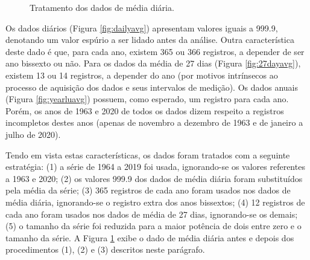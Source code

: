 \begin{figure}[ht!]
	\caption{Tratamento dos dados de média diária.}
	\vspace{0mm}	%
	\begin{center}
	\end{center}
	\vspace{3mm}	%
	\label{fig:datavis}
\end{figure}

Os dados diários (Figura \ref{fig:dailyavg}) apresentam valores iguais a 999.9, denotando um valor espúrio a ser lidado antes da análise. Outra característica deste dado é que, para cada ano, existem 365 ou 366 registros, a depender de ser ano bissexto ou não. Para os dados da média de 27 dias (Figura \ref{fig:27dayavg}), existem 13 ou 14 registros, a depender do ano (por motivos intrínsecos ao processo de aquisição dos dados e seus intervalos de medição). Os dados anuais (Figura \ref{fig:yearluavg}) possuem, como esperado, um registro para cada ano. Porém, os anos de 1963 e 2020 de todos os dados dizem respeito a registros incompletos destes anos (apenas de novembro a dezembro de 1963 e de janeiro a julho de 2020). 

Tendo em vista estas características, os dados foram tratados com a seguinte estratégia: (1) a série de 1964 a 2019 foi usada, ignorando-se os valores referentes a 1963 e 2020; (2) os valores 999.9 dos dados de média diária foram substituídos pela média da série; (3) 365 registros de cada ano foram usados nos dados de média diária, ignorando-se o registro extra dos anos bissextos; (4) 12 registros de cada ano foram usados nos dados de média de 27 dias, ignorando-se os demais; (5) o tamanho da série foi reduzida para a maior potência de dois entre zero e o tamanho da série. A Figura \ref{fig:datavis} exibe o dado de média diária antes e depois dos procedimentos (1), (2) e (3) descritos neste parágrafo. 